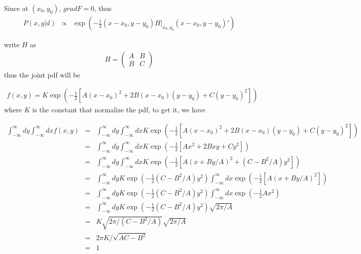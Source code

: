 \documentclass[11pt]{article}
\begin{document}
Since at $(x_0,y_0)$, $grad F = 0$, thus
\begin{eqnarray*}
P(x,y | d ) &\propto &
\exp \left(
 - \frac{1}{2} (x-x_0, y-y_0) H|_{x_0,y_0} (x-x_0, y-y_0)'
 \right)
\end{eqnarray*}

write $H$ as 
\begin{eqnarray*}
H= \begin{pmatrix}
A & B \\
B & C
\end{pmatrix}
\end{eqnarray*}
thus the joint pdf will be

\begin{eqnarray*}
f(x,y) = K \exp \left(
 - \frac{1}{2} [ A(x-x_0)^2 + 2B(x-x_0)(y-y_0) + C(y-y_0)^2 ]  
 \right)
\end{eqnarray*}
where $K$ is the constant that normalize the pdf, to get it, we have

\begin{eqnarray*}
\int_{-\infty}^{\infty} dy \int_{-\infty}^{\infty} dx f(x,y) & = &
\int_{-\infty}^{\infty} dy \int_{-\infty}^{\infty} dx 
K \exp \left(
 - \frac{1}{2} [ A(x-x_0)^2 + 2B(x-x_0)(y-y_0) + C(y-y_0)^2 ]  
 \right) \\
 & = &
 \int_{-\infty}^{\infty} dy \int_{-\infty}^{\infty} dx 
K \exp \left(
 - \frac{1}{2} [ Ax^2 + 2Bxy + Cy^2 ]  
 \right) \\
  & = &
 \int_{-\infty}^{\infty} dy \int_{-\infty}^{\infty} dx 
K \exp \left(
 - \frac{1}{2} [ A(x + By/A)^2 + (C - B^2/A)y^2 ]  
 \right) \\ 
   & = &
 \int_{-\infty}^{\infty} dy K \exp \left(
 - \frac{1}{2} (C - B^2/A)y^2
 \right)
 \int_{-\infty}^{\infty} dx 
\exp \left(
 - \frac{1}{2} [ A(x + By/A)^2 ]  
 \right) \\ 
    & = &
 \int_{-\infty}^{\infty} dy K \exp \left(
 - \frac{1}{2} (C - B^2/A)y^2
 \right)
 \int_{-\infty}^{\infty} dx 
\exp \left(
 - \frac{1}{2} Ax^2  
 \right) \\ 
    & = &
 \int_{-\infty}^{\infty} dy K \exp \left(
 - \frac{1}{2} (C - B^2/A)y^2
 \right) \sqrt{2\pi/A} \\
   & = &
 K \sqrt{2\pi/(C-B^2/A)}\sqrt{2\pi/A} \\
 & = & 2 \pi K / \sqrt{ A C - B ^2} \\
 & = & 1
\end{eqnarray*}
\end{document}
